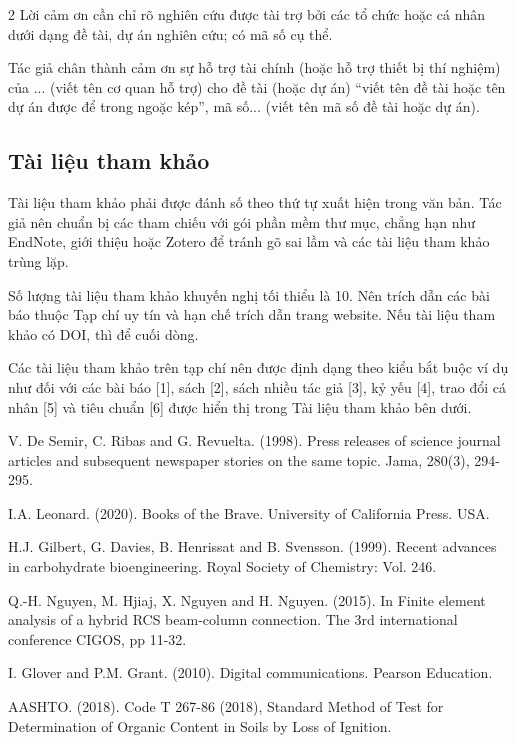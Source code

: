 \documentclass[10pt]{article}
\begin{document}
\begin{multicols}{2}
Lời cảm ơn cần chỉ rõ nghiên cứu được tài trợ bởi các tổ chức hoặc cá
nhân dưới dạng đề tài, dự án nghiên cứu; có mã số cụ thể.

Tác giả chân thành cảm ơn sự hỗ trợ tài chính (hoặc hỗ trợ thiết bị
thí nghiệm) của ... (viết tên cơ quan hỗ trợ) cho đề tài (hoặc dự án)
``viết tên đề tài hoặc tên dự án được để trong ngoặc kép'', mã số...
(viết tên mã số đề tài hoặc dự án).

\subsection*{Tài liệu tham khảo}

Tài liệu tham khảo phải được đánh số theo thứ tự xuất hiện trong văn
bản. Tác giả nên chuẩn bị các tham chiếu với gói phần mềm thư mục,
chẳng hạn như EndNote, giới thiệu hoặc Zotero để tránh gõ sai lầm và
các tài liệu tham khảo trùng lặp.

Số lượng tài liệu tham khảo khuyến nghị tối thiểu là 10. Nên trích dẫn
các bài báo thuộc Tạp chí uy tín và hạn chế trích dẫn trang website.
Nếu tài liệu tham khảo có DOI, thì để cuối dòng.

Các tài liệu tham khảo trên tạp chí nên được định dạng theo kiểu bắt
buộc ví dụ như đối với các bài báo [1], sách [2], sách nhiều tác giả
[3], kỷ yếu [4], trao đổi cá nhân [5] và tiêu chuẩn [6] được hiển thị
trong Tài liệu tham khảo bên dưới.

\begin{list}{}{%
  \setlength{\leftmargin}{1.4em}
  \setlength{\itemindent}{-1.4em}
  \setlength{\itemsep}{4pt}
  \setlength{\parsep}{0pt}
}
\fontsize{9}{11}\selectfont

\item[{[1]}.] V. De Semir, C. Ribas and G. Revuelta. (1998). Press
releases of science journal articles and subsequent newspaper stories
on the same topic. Jama, 280(3), 294-295.

\item[{[2]}.] I.A. Leonard. (2020). Books of the Brave. University of
California Press. USA.

\item[{[3]}.] H.J. Gilbert, G. Davies, B. Henrissat and B. Svensson.
(1999). Recent advances in carbohydrate bioengineering. Royal Society
of Chemistry: Vol. 246.

\item[{[4]}.] Q.-H. Nguyen, M. Hjiaj, X. Nguyen and H. Nguyen. (2015).
In Finite element analysis of a hybrid RCS beam-column connection.
The 3rd international conference CIGOS, pp 11-32.

\item[{[5]}.] I. Glover and P.M. Grant. (2010). Digital
communications. Pearson Education.

\item[{[6]}.] AASHTO. (2018). Code T 267-86 (2018), Standard Method
of Test for Determination of Organic Content in Soils by Loss of
Ignition.

\end{list}

\end{multicols}
\end{document}
